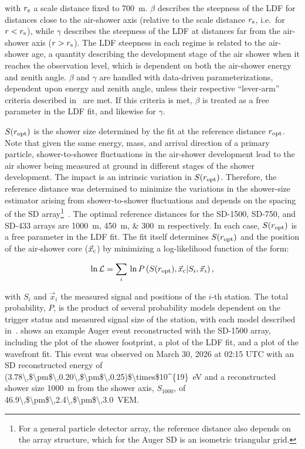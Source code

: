\noindent
with $r_{\rm s}$ a scale distance fixed to \qty{700}{\meter}.
$\beta$ describes the steepness of the LDF for distances close to the air-shower axis (relative to the scale distance $r_{\rm s}$, i.e.~for $r<r_{\rm s}$), while $\gamma$ describes the steepness of the LDF at distances far from the air-shower axis ($r>r_{\rm s}$).
The LDF steepness in each regime is related to the air-shower age, a quantity describing the development stage of the air shower when it reaches the observation level, which is dependent on both the air-shower energy and zenith angle.
$\beta$ and $\gamma$ are handled with data-driven parameterizations, dependent upon energy and zenith angle, unless their respective ``lever-arm'' criteria described in~\cite{auger_jinst2020_sdreconstruction} are met.
If this criteria is met, $\beta$ is treated as a free parameter in the LDF fit, and likewise for $\gamma$.

$S(r_{\rm opt})$ is the shower size determined by the fit at the reference distance $r_{\rm opt}$.
Note that given the same energy, mass, and arrival direction of a primary particle, shower-to-shower fluctuations in the air-shower development lead to the air shower being measured at ground in different stages of the shower development.
The impact is an intrinsic variation in $S(r_{\rm opt})$.
Therefore, the reference distance was determined to minimize the variations in the shower-size estimator arising from shower-to-shower fluctuations and depends on the spacing of the SD array\footnote[2]{For a general particle detector array, the reference distance also depends on the array structure, which for the Auger SD is an isometric triangular grid.}~\cite{newton_2007_ropt}.
The optimal reference distances for the SD-1500, SD-750, and SD-433 arrays are \qtylist{1000;450;300}{\meter} respectively.
In each case, $S(r_{\rm opt})$ is a free parameter in the LDF fit.
The fit itself determines $S(r_{\rm opt})$ and the position of the air-shower core ($\vec{x}_{\rm c}$) by minimizing a log-likelihood function of the form:

\begin{equation}
    \ln\mathcal{L} = \sum_{i}\,\ln P\left( S(r_{\rm opt}),\vec{x}_{\rm c} | S_{i},\vec{x}_{i} \right), \label{eq:sd_ll}
\end{equation}

\noindent
with $S_{i}$ and $\vec{x}_{i}$ the measured signal and positions of the $i$-th station.
The total probability, $P$, is the product of several probability models dependent on the trigger status and measured signal size of the station, with each model described in~\cite{auger_jinst2020_sdreconstruction}.
 shows an example Auger event reconstructed with the SD-1500 array, including the plot of the shower footprint, a plot of the LDF fit, and a plot of the wavefront fit.
This event was observed on March 30, 2026 at 02:15 UTC with an SD reconstructed energy of \qty[parse-numbers=false]{(3.78\,$\pm$\,0.20\,$\pm$\,0.25)$\times$10^{19}}{\electronvolt} and a reconstructed shower size \qty{1000}{\meter} from the shower axis, $S_{1000}$, of \qty[parse-numbers=false]{46.9\,$\pm$\,2.4\,$\pm$\,3.0}{VEM}.

